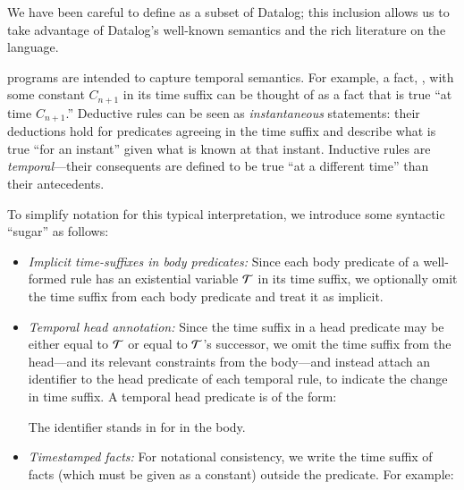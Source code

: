 \label{sec:abbrvsyntax}

We have been careful to define \slang as a subset of Datalog; this inclusion allows us to take advantage of Datalog's
well-known semantics and the rich literature on the language.

\slang programs are intended to capture 
temporal semantics.  For example, a fact, , with some constant $C_{n+1}$ in its time
suffix can be thought of as a fact that is true ``at time $C_{n+1}$.''
Deductive rules can be seen as {\em instantaneous} statements: their deductions hold for 
predicates agreeing in the time suffix and describe what is true ``for an instant'' given 
what is known at that instant.
 Inductive %
 rules are {\em temporal}---their consequents are defined to
be true ``at a different time'' than their antecedents. 



To simplify \slang notation for this typical interpretation, we
introduce some syntactic ``sugar'' as follows:

\begin{itemize}
\item {\em Implicit time-suffixes in body predicates:} Since each body
predicate of a well-formed rule has an existential variable $\Tau$ in its
time suffix, we optionally omit the time suffix from each body predicate and treat
it as implicit.
\item {\em Temporal head annotation:} Since the time suffix in a head predicate
may be either equal to $\Tau$ or equal to $\Tau$'s successor, we omit the time
suffix from the head---and its relevant constraints from the body---and
instead attach an identifier to the head predicate of each temporal rule, to indicate the change in
time suffix.  A temporal head predicate is of the form:


The identifier  stands in for  in
the body.

\item {\em Timestamped facts:} For notational consistency, we write the time suffix of facts (which
must be given as a constant) outside the predicate.  For example:


\end{itemize}


